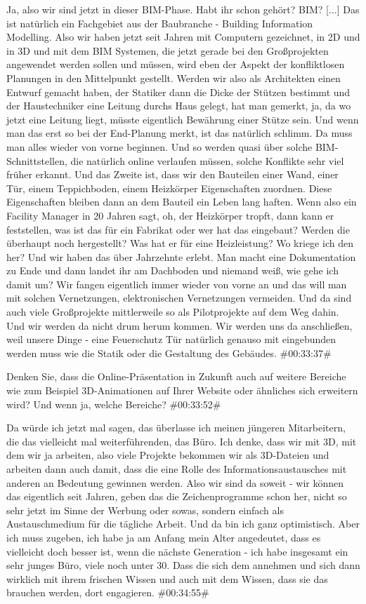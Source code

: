 \begin{description}
\Andre Ja, also wir sind jetzt in dieser BIM-Phase. Habt ihr schon gehört? BIM? [...] Das ist natürlich ein Fachgebiet aus der Baubranche - Building Information Modelling. Also wir haben jetzt seit Jahren mit Computern gezeichnet, in 2D und in 3D und mit dem BIM Systemen, die jetzt gerade bei den Großprojekten angewendet werden sollen und müssen, wird eben der Aspekt der konfliktlosen Planungen in den Mittelpunkt gestellt. Werden wir also als Architekten einen Entwurf gemacht haben, der Statiker dann die Dicke der Stützen bestimmt und der Haustechniker eine Leitung durchs Haus gelegt, hat man gemerkt, ja, da wo jetzt eine Leitung liegt, müsste eigentlich Bewährung einer Stütze sein. Und wenn man das erst so bei der End-Planung merkt, ist das natürlich schlimm. Da muss man alles wieder von vorne beginnen. Und so werden quasi über solche BIM-Schnittstellen, die natürlich online verlaufen müssen, solche Konflikte sehr viel früher erkannt. Und das Zweite ist, dass wir den Bauteilen einer Wand, einer Tür, einem Teppichboden, einem Heizkörper Eigenschaften zuordnen. Diese Eigenschaften bleiben dann an dem Bauteil ein Leben lang haften. Wenn also ein Facility Manager in 20 Jahren sagt, oh, der Heizkörper tropft, dann kann er feststellen, was ist das für ein Fabrikat oder wer hat das eingebaut? Werden die überhaupt noch hergestellt? Was hat er für eine Heizleistung? Wo kriege ich den her? Und wir haben das über Jahrzehnte erlebt. Man macht eine Dokumentation zu Ende und dann landet ihr am Dachboden und niemand weiß, wie gehe ich damit um? Wir fangen eigentlich immer wieder von vorne an und das will man mit solchen Vernetzungen, elektronischen Vernetzungen vermeiden. Und da sind auch viele Großprojekte mittlerweile so als Pilotprojekte auf dem Weg dahin. Und wir werden da nicht drum herum kommen. Wir werden uns da anschließen, weil unsere Dinge - eine Feuerschutz Tür natürlich genauso mit eingebunden werden muss wie die Statik oder die Gestaltung des Gebäudes. \#00:33:37\#

\Fabian Denken Sie, dass die Online-Präsentation in Zukunft auch auf weitere Bereiche wie zum Beispiel 3D-Animationen auf Ihrer Website oder ähnliches sich erweitern wird? Und wenn ja, welche Bereiche? \#00:33:52\#

\Andre Da würde ich jetzt mal sagen, das überlasse ich meinen jüngeren Mitarbeitern, die das vielleicht mal weiterführenden, das Büro. Ich denke, dass wir mit 3D, mit dem wir ja arbeiten, also viele Projekte bekommen wir als 3D-Dateien und arbeiten dann auch damit, dass die eine Rolle des Informationsaustausches mit anderen an Bedeutung gewinnen werden. Also wir sind da soweit - wir können das eigentlich seit Jahren, geben das die Zeichenprogramme schon her, nicht so sehr jetzt im Sinne der Werbung oder sowas, sondern einfach als Austauschmedium für die tägliche Arbeit. Und da bin ich ganz optimistisch. Aber ich muss zugeben, ich habe ja am Anfang mein Alter angedeutet, dass es vielleicht doch besser ist, wenn die nächste Generation - ich habe insgesamt ein sehr junges Büro, viele noch unter 30. Dass die sich dem annehmen und sich dann wirklich mit ihrem frischen Wissen und auch mit dem Wissen, dass sie das brauchen werden, dort engagieren. \#00:34:55\#


\end{description}
